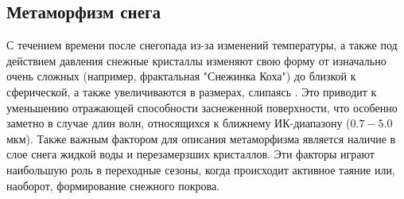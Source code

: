 \documentclass[a4paper, fontsize=14pt]{scrartcl}
\begin{document}
\subsection{Метаморфизм снега}

С течением времени после снегопада из-за изменений температуры, а также под действием давления снежные кристаллы изменяют свою форму от изначально очень сложных (например, фрактальная "Снежинка Коха") до близкой к сферической, а также увеличиваются в размерах, слипаясь \cite{Grenfell1999, Grenfell2005, He2018}. Это приводит к уменьшению отражающей способности заснеженной поверхности, что особенно заметно в случае длин волн, относящихся к ближнему ИК-диапазону ($0.7-5.0$ мкм). Также важным фактором для описания метаморфизма является наличие в слое снега жидкой воды и перезамерзших кристаллов. Эти факторы играют наибольшую роль в переходные сезоны, когда происходит активное таяние или, наоборот, формирование снежного покрова.
\end{document}
